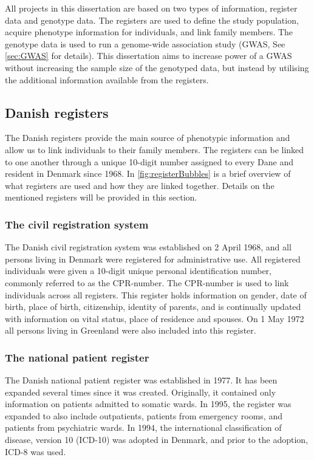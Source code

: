 All projects in this dissertation are based on two types of information, 
register data and genotype data. The registers are used to define the study 
population, acquire phenotype information for individuals, and link family 
members. The genotype data is used to run a genome-wide association study (GWAS, See 
\cref{sec:GWAS} for details). This dissertation aims to increase power of a 
GWAS without increasing the sample size of the genotyped data, but instead by 
utilising the additional information available from the registers. 

\subsection{Danish registers}
The Danish registers provide the main source of phenotypic information and allow us to link individuals to their family members. The registers can be linked to one another through a unique 10-digit number assigned to every Dane and resident in Denmark since 1968. In \cref{fig:registerBubbles} is a brief overview of what registers are used and how they are linked together. Details on the mentioned registers will be provided in this section.


\subsubsection{The civil registration system}
The Danish civil registration system was established on 2 April 1968, and all persons living in Denmark were registered for administrative use. All registered individuals were given a 10-digit unique personal identification number, commonly referred to as the CPR-number. The CPR-number is used to link individuals across all registers. This register holds information on gender, date of birth, place of birth, citizenship, identity of parents, and is continually updated with information on vital status, place of residence and spouses. On 1 May 1972 all persons living in Greenland were also included into this register\cite{pedersen2011danish}. 

\subsubsection{The national patient register}
The Danish national patient register was established in 1977. It has been expanded several times since it was created. Originally, it contained only information on patients admitted to somatic wards. In 1995, the register was expanded to also include outpatients, patients from emergency rooms, and patients from psychiatric wards. In 1994, the international classification of disease, version 10 (ICD-10) was adopted in Denmark, and prior to the adoption, ICD-8 was used\cite{lynge2011danish}. 


